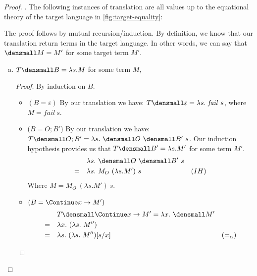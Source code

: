 


\begin{proof}
    .
    The following instances of translation are all values up to the equational theory of the target language in \cref{fig:target-equality}:

    The proof follows by mutual recursion/induction.
    By definition, we know that our translation return terms in the target language.
    In other words, we can say that $\den{M}=M'$ for some target term $M'$.
    \begin{enumerate}[(a)]
        \item $T\den{B} = \lambda s. M$ for some term $M$,
        \begin{proof}
            By induction on $B$.
            \begin{itemize}
                \item $(B = \varepsilon)$ By our translation we have: $T\den{\varepsilon} = \lambda s. ~\mathit{fail} ~s$, where $M=\mathit{fail} ~s$.
                \item ($B = O; B'$) By our translation we have: $T\den{O; B'} = \lambda s. ~\den{O} ~\den{B'} ~s$.
                    Our induction hypothesis provides us that $T\den{B'} = \lambda s. M'$ for some term $M'$.
                    \begin{align*}
                        & \quad \lambda s. ~\den{O} ~\den{B'} ~s \\
                        =& \quad \lambda s. ~M_O ~(\lambda s. M') ~s & (IH)
                    \end{align*}
                    Where $M=M_O ~(\lambda s. M') ~s$.
                \item $(B = \Continue x \to M')$ 
                    \begin{align*}
                        & \quad T\den{\Continue x \to M'} = \lambda x. ~\den{M'} \\
                        =& \quad \lambda x. ~(\lambda s. ~M'') \\
                        =& \quad \lambda s. ~(\lambda s. ~M'') \subst{x}{s} & (=_{\alpha})
                    \end{align*} 

\end{itemize}
\end{proof}
\end{enumerate}
\end{proof}
